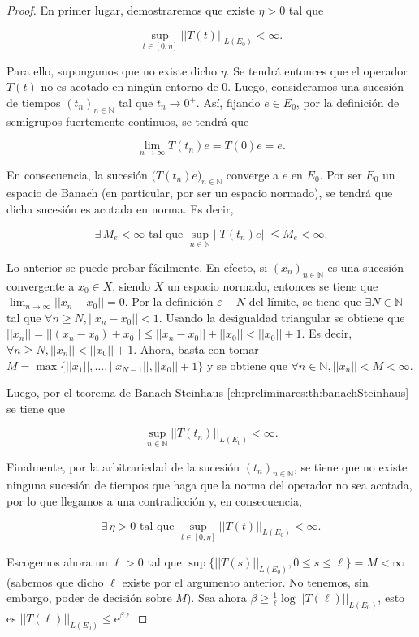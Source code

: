 \begin{proof}
En primer lugar, demostraremos que existe $\eta > 0$ tal que 

\[\sup_{t\in [0, \eta]}||T(t)||_{L(E_0)} < \infty.\] 

Para ello, supongamos que no existe dicho $\eta$. Se tendrá entonces que el operador $T(t)$ no es acotado en ningún entorno de $0$. Luego, consideramos una sucesión de tiempos $(t_n)_{n\in \mathbb{N}}$ tal que $t_n \rightarrow 0^+$. Así, fijando $e \in E_0$, por la definición de semigrupos fuertemente continuos, se tendrá que

\[\lim_{n \rightarrow \infty} T(t_n)e = T(0)e = e.\]

En consecuencia, la sucesión $\big(T(t_n)e\big)_{n \in \mathbb{N}}$ converge a $e$ en $E_0$. Por ser $E_0$ un espacio de Banach (en particular, por ser un espacio normado), se tendrá que dicha sucesión es acotada en norma. Es decir,

\[\exists\, M_e < \infty  \text{ tal que } \sup_{n \in \mathbb{N}}||T(t_n)e|| \leq M_e < \infty.\]

Lo anterior se puede probar fácilmente. En efecto, si $(x_n)_{n \in \mathbb{N}}$ es una sucesión convergente a $x_0 \in X$, siendo $X$ un espacio normado, entonces se tiene que $\lim_{n \rightarrow \infty} ||x_n - x_0|| = 0$. Por la definición $\varepsilon-N$ del límite, se tiene que $\exists N \in \mathbb{N}$ tal que $\forall n \geq N, ||x_n - x_0|| < 1$. Usando la desigualdad triangular se obtiene que $||x_n|| = ||(x_n - x_0) + x_0|| \leq ||x_n - x_0|| + ||x_0|| < ||x_0|| + 1$. Es decir, $\forall n \geq N, ||x_n|| < ||x_0|| + 1$. Ahora, basta con tomar $M = \max\{||x_1||, \ldots, ||x_{N-1}||, ||x_0|| + 1\}$ y se obtiene que $\forall n \in \mathbb{N}, ||x_n|| < M < \infty$.

Luego, por el teorema de Banach-Steinhaus \ref{ch:preliminares:th:banachSteinhaus} se tiene que

\[\sup_{n \in \mathbb{N}}||T(t_n)||_{L(E_0)} < \infty.\]

Finalmente, por la arbitrariedad de la sucesión $(t_n)_{n \in \mathbb{N}}$, se tiene que no existe ninguna sucesión de tiempos que haga que la norma del operador no sea acotada, por lo que llegamos a una contradicción y, en consecuencia,

\[\exists \, \eta > 0 \text{ tal que } \sup_{t \in [0, \eta]}||T(t)||_{L(E_0)} < \infty.\]

Escogemos ahora un $\ell > 0$ tal que $\sup \{||T(s)||_{L(E_0)} , 0 \leq s \leq \ell\} = M < \infty$ (sabemos que dicho $\ell$ existe por el argumento anterior. No tenemos, sin embargo, poder de decisión sobre $M$). Sea ahora $\beta \geq \frac{1}{\ell} \log||T(\ell)||_{L(E_0)}$, esto es $||T(\ell)||_{L(E_0)} \leq \mathrm{e}^{\beta \ell}$


\end{proof}
